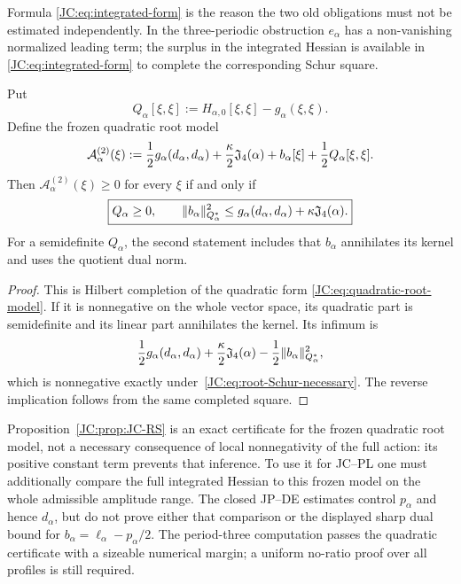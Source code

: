 Formula \eqref{JC:eq:integrated-form} is the reason the two old obligations
must not be estimated independently.  In the three-periodic obstruction
$e_\alpha$ has a non-vanishing normalized leading term; the surplus in the
integrated Hessian is available in \eqref{JC:eq:integrated-form} to complete
the corresponding Schur square.

\begin{proposition}
\label{JC:prop:JC-RS}
Put
\begin{equation}\label{JC:eq:root-form}
 Q_\alpha[\xi,\xi]
 :=H_{\alpha,0}[\xi,\xi]-g_\alpha(\xi,\xi).
\end{equation}
Define the frozen quadratic root model
\begin{equation}\label{JC:eq:quadratic-root-model}
 \mathcal{A}_\alpha^{(2)}(\xi)
 :=\frac12g_\alpha(d_\alpha,d_\alpha)
   +\frac\kappa2\mathfrak J_4(\alpha)
   +b_\alpha[\xi]+\frac12Q_\alpha[\xi,\xi].
\end{equation}
Then $\mathscr A_\alpha^{(2)}(\xi)\ge0$ for every $\xi$ if and only if
\begin{equation}\label{JC:eq:root-Schur-necessary}
 \boxed{
 Q_\alpha\ge0,
 \qquad
 \|b_\alpha\|_{Q_\alpha^*}^2
 \le g_\alpha(d_\alpha,d_\alpha)
       +\kappa\mathfrak J_4(\alpha).}
\end{equation}
For a semidefinite $Q_\alpha$, the second statement includes that
$b_\alpha$ annihilates its kernel and uses the quotient dual norm.
\end{proposition}

\begin{proof}
This is Hilbert completion of the quadratic form
\eqref{JC:eq:quadratic-root-model}.  If it is nonnegative on the whole vector
space, its quadratic part is semidefinite and its linear part annihilates
the kernel.  Its infimum is
\[
 \frac12g_\alpha(d_\alpha,d_\alpha)
 +\frac\kappa2\mathfrak J_4(\alpha)
 -\frac12\|b_\alpha\|_{Q_\alpha^*}^2,
\]
which is nonnegative exactly under~\eqref{JC:eq:root-Schur-necessary}.  The
reverse implication follows from the same completed square.
\end{proof}

Proposition~\ref{JC:prop:JC-RS} is an exact certificate for the frozen
quadratic root model, not a necessary consequence of local nonnegativity
of the full action: its positive constant term prevents that inference.
To use it for JC--PL one must additionally compare the full integrated
Hessian to this frozen model on the whole admissible amplitude range.  The
closed JP--DE estimates control $p_\alpha$ and hence $d_\alpha$, but do not
prove either that comparison or the displayed sharp dual bound for
$b_\alpha=\ell_\alpha-p_\alpha/2$.  The period-three computation passes
the quadratic certificate with a sizeable numerical margin; a uniform
no-ratio proof over all profiles is still required.

